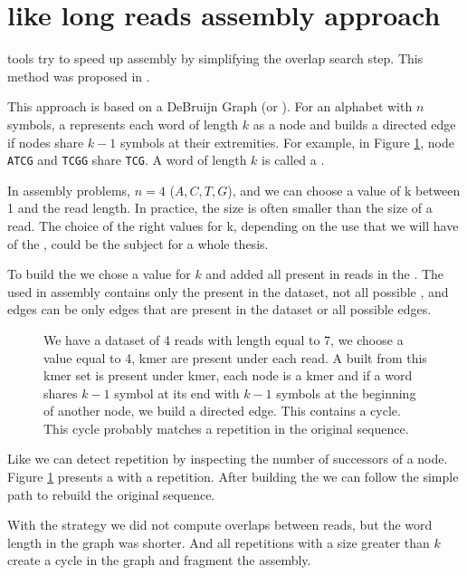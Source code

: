 \documentclass[main]{subfiles}
\begin{document}
\section{\DBG like long reads assembly approach} \label{section:sota:wtdbg}

\DBG tools try to speed up assembly by simplifying the overlap search step. This method was proposed in  \cite{eulerian_approach}.

This approach is based on a DeBruijn Graph (or \DBG). For an alphabet with $n$ symbols, a \DBG represents each word of length $k$ as a node and builds a directed edge if nodes share $k - 1$ symbols at their extremities. For example, in Figure \ref{intro:fig:dbg:graph}, node \texttt{ATCG} and \texttt{TCGG} share \texttt{TCG}. A word of length $k$ is called a \kmer.

In assembly problems, $n = 4$ (${A, C, T, G}$), and we can choose a value of k between 1 and the read length. In practice, the size is often smaller than the size of a read. The choice of the right values for k, depending on the use that we will have of the \DBG, could be the subject for a whole thesis.

To build the \DBG we chose a value for $k$ and added all \kmer present in reads in the \DBG. The \DBG used in assembly contains only the \kmer present in the dataset, not all possible \kmer, and edges can be only edges that are present in the dataset or all possible edges.

\begin{figure}[ht]
    \center
    
    \caption{We have a dataset of 4 reads with length equal to 7, we choose a value equal to 4, kmer are present under each read. A \DBG built from this kmer set is present under kmer, each node is a kmer and if a word shares $k - 1$ symbol at its end with $k - 1$ symbols at the beginning of another node, we build a directed edge. This \DBG contains a cycle. This cycle probably matches a repetition in the original sequence.}
    \label{intro:fig:dbg:graph}
\end{figure}

Like \OLC we can detect repetition by inspecting the number of successors of a node. Figure \ref{intro:fig:dbg:graph} presents a \DBG with a repetition. After building the \DBG we can follow the simple path to rebuild the original sequence.

With the \DBG strategy we did not compute overlaps between reads, but the word length in the graph was shorter. And all repetitions with a size greater than $k$ create a cycle in the graph and fragment the assembly.
\end{document}
